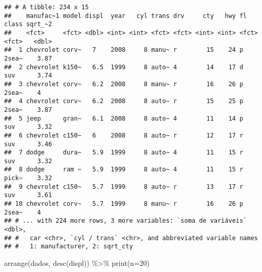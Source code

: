 \documentclass[
]{book}
\newenvironment{Shaded}{\begin{snugshade}}{\end{snugshade}}
\newcommand{\AttributeTok}[1]{\textcolor[rgb]{0.77,0.63,0.00}{#1}}
\newcommand{\DecValTok}[1]{\textcolor[rgb]{0.00,0.00,0.81}{#1}}
\newcommand{\FunctionTok}[1]{\textcolor[rgb]{0.00,0.00,0.00}{#1}}
\newcommand{\NormalTok}[1]{#1}
\newcommand{\SpecialCharTok}[1]{\textcolor[rgb]{0.00,0.00,0.00}{#1}}
\begin{document}
\begin{verbatim}
## # A tibble: 234 x 15
##    manufac~1 model displ  year   cyl trans drv     cty   hwy fl    class sqrt_~2
##    <fct>     <fct> <dbl> <int> <int> <fct> <fct> <int> <int> <fct> <fct>   <dbl>
##  1 chevrolet corv~   7    2008     8 manu~ r        15    24 p     2sea~    3.87
##  2 chevrolet k150~   6.5  1999     8 auto~ 4        14    17 d     suv      3.74
##  3 chevrolet corv~   6.2  2008     8 manu~ r        16    26 p     2sea~    4   
##  4 chevrolet corv~   6.2  2008     8 auto~ r        15    25 p     2sea~    3.87
##  5 jeep      gran~   6.1  2008     8 auto~ 4        11    14 p     suv      3.32
##  6 chevrolet c150~   6    2008     8 auto~ r        12    17 r     suv      3.46
##  7 dodge     dura~   5.9  1999     8 auto~ 4        11    15 r     suv      3.32
##  8 dodge     ram ~   5.9  1999     8 auto~ 4        11    15 r     pick~    3.32
##  9 chevrolet c150~   5.7  1999     8 auto~ r        13    17 r     suv      3.61
## 10 chevrolet corv~   5.7  1999     8 manu~ r        16    26 p     2sea~    4   
## # ... with 224 more rows, 3 more variables: `soma de variáveis` <dbl>,
## #   car <chr>, `cyl / trans` <chr>, and abbreviated variable names
## #   1: manufacturer, 2: sqrt_cty
\end{verbatim}

\begin{Shaded}
\begin{Highlighting}[]
\FunctionTok{arrange}\NormalTok{(dados, }\FunctionTok{desc}\NormalTok{(displ)) }\SpecialCharTok{\%\textgreater{}\%} 
  \FunctionTok{print}\NormalTok{(}\AttributeTok{n=}\DecValTok{20}\NormalTok{)}
\end{Highlighting}
\end{Shaded}
\end{document}
